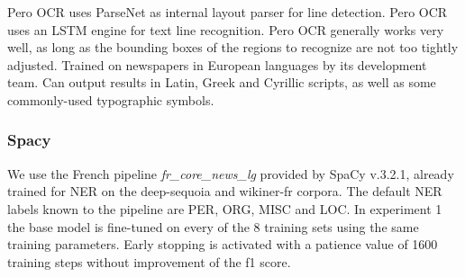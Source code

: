 Pero OCR uses ParseNet  as internal layout parser for line detection.
Pero OCR uses an LSTM engine  for text line recognition.
Pero OCR generally works very well, as long as the bounding boxes of the regions to recognize are not too tightly adjusted.
Trained on newspapers in European languages by its development team.
Can output results in Latin, Greek and Cyrillic scripts, as well as some commonly-used typographic symbols.



\subsubsection{Spacy}
We use the French pipeline \textit{fr\_core\_news\_lg} provided by SpaCy v.3.2.1, already trained for NER on the deep-sequoia and wikiner-fr corpora.
The default NER labels known to the pipeline are PER, ORG, MISC and LOC.
In experiment 1 the base model is fine-tuned on every of the 8 training sets using the same training parameters.
Early stopping is activated with a patience value of 1600 training steps without improvement of the f1 score.





